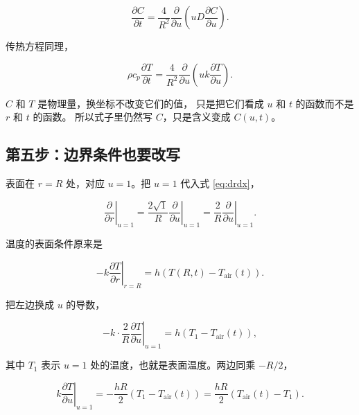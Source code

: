 \begin{equation}
\boxed{\;
\frac{\partial C}{\partial t}=\frac{4}{R^2}\frac{\partial}{\partial u}\left(uD\frac{\partial C}{\partial u}\right).
\;}
\label{eq:mass-u}
\end{equation}

传热方程同理，

\begin{equation}
\boxed{\;
\rho c_p\frac{\partial T}{\partial t}=\frac{4}{R^2}\frac{\partial}{\partial u}\left(uk\frac{\partial T}{\partial u}\right).
\;}
\label{eq:energy-u}
\end{equation}

$C$ 和 $T$ 是物理量，换坐标不改变它们的值，
只是把它们看成 $u$ 和 $t$ 的函数而不是 $r$ 和 $t$ 的函数。
所以式子里仍然写 $C$，只是含义变成 $C(u,t)$。

\subsection{第五步：边界条件也要改写}

表面在 $r=R$ 处，对应 $u=1$。把 $u=1$ 代入式 \eqref{eq:drdx}，

\begin{equation}
\left.\frac{\partial}{\partial r}\right|_{u=1}
= \frac{2\sqrt{1}}{R}\left.\frac{\partial}{\partial u}\right|_{u=1}
= \frac{2}{R}\left.\frac{\partial}{\partial u}\right|_{u=1}.
\end{equation}

温度的表面条件原来是

\begin{equation}
-k\left.\frac{\partial T}{\partial r}\right|_{r=R}
= h\left(T(R,t)-T_{\mathrm{air}}(t)\right).
\end{equation}

把左边换成 $u$ 的导数，

\begin{equation}
-k\cdot\frac{2}{R}\left.\frac{\partial T}{\partial u}\right|_{u=1}
= h\left(T_1-T_{\mathrm{air}}(t)\right),
\end{equation}

其中 $T_1$ 表示 $u=1$ 处的温度，也就是表面温度。两边同乘 $-R/2$，

\begin{equation}
k\left.\frac{\partial T}{\partial u}\right|_{u=1}
= -\frac{hR}{2}\left(T_1-T_{\mathrm{air}}(t)\right)
= \frac{hR}{2}\left(T_{\mathrm{air}}(t)-T_1\right).
\label{eq:bcu-T}
\end{equation}

